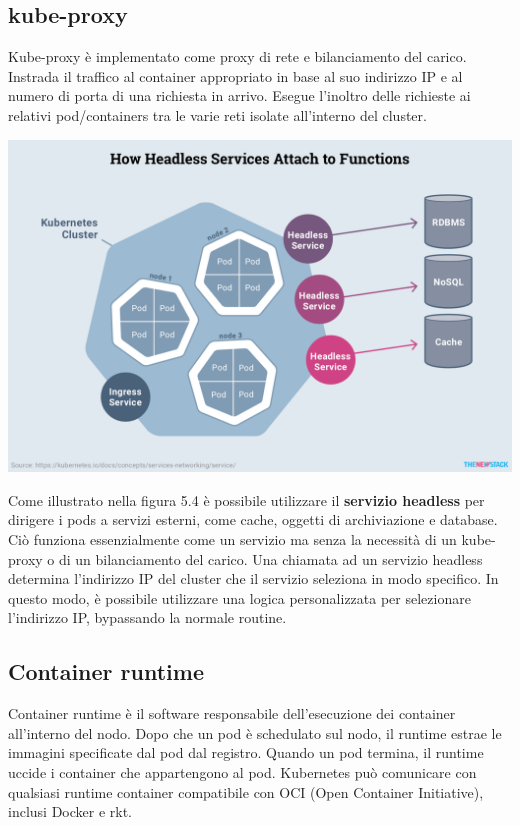 \documentclass[12pt, a4paper]{report}
\begin{document}
\subsection{kube-proxy}
Kube-proxy è implementato come proxy di rete e bilanciamento del carico. Instrada il traffico al container appropriato in base al suo indirizzo IP e al numero di porta di una richiesta in arrivo. Esegue l'inoltro delle richieste ai relativi pod/containers tra le varie reti isolate all'interno del cluster.
\begin{center}
  \includegraphics[scale=0.47]{Images/Kubernetes-proxy}
\end{center}
Come illustrato nella figura 5.4 è possibile utilizzare il \textbf{servizio headless} per dirigere i pods a servizi esterni, come cache, oggetti di archiviazione e database. Ciò funziona essenzialmente come un servizio ma senza la necessità di un kube-proxy o di un bilanciamento del carico. Una chiamata ad un servizio headless determina l'indirizzo IP del cluster che il servizio seleziona in modo specifico. In questo modo, è possibile utilizzare una logica personalizzata per selezionare l'indirizzo IP, bypassando la normale routine.
\subsection{Container runtime}
Container runtime è il software responsabile dell'esecuzione dei container all'interno del nodo. Dopo che un pod è schedulato sul nodo, il runtime estrae le immagini specificate dal pod dal registro. Quando un pod  termina, il runtime uccide i container che appartengono al pod. Kubernetes può comunicare con qualsiasi runtime container compatibile con OCI (Open Container Initiative), inclusi Docker e rkt.
\end{document}
